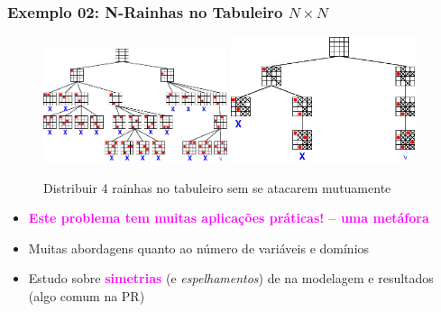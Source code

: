 \begin{frame}[fragile]

\frametitle{Exemplo 02: N-Rainhas no Tabuleiro $N\times N$}

\begin{figure}[!htb]
\begin{center}
\includegraphics[width=0.480\textwidth, height=0.40\textheight]{figures/4_rainhas_01.jpg}
\hfill
\includegraphics[width=0.480\textwidth, height=0.40\textheight]{figures/4_rainhas_02.jpg}
\caption{Distribuir 4 rainhas no tabuleiro sem se atacarem mutuamente}
\end{center}
\end{figure}

\begin{footnotesize}
\begin{itemize}
  \item \textcolor{magenta}{\textbf{Este problema tem muitas aplicações práticas! -- uma metáfora}} 
  \item Muitas abordagens quanto ao número de variáveis e domínios
  \item Estudo sobre \textcolor{magenta}{\textbf{simetrias}} (e \textit{espelhamentos}) de na modelagem e  resultados (algo comum na PR)
\end{itemize}

\end{footnotesize}
\end{frame}



